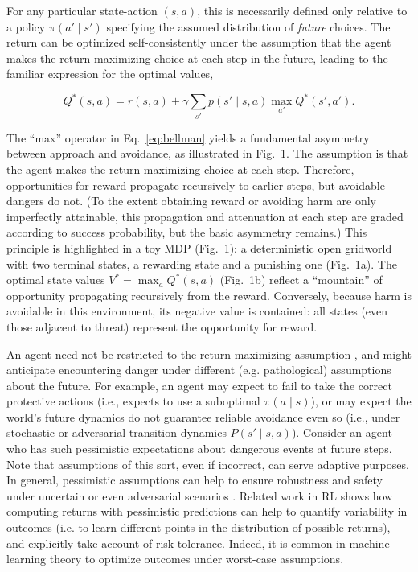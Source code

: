 \documentclass[11pt]{article} %
\begin{document}
For any particular state-action $(s,a)$, this is necessarily defined only relative to a policy $\pi(a' \mid s')$ specifying the assumed distribution of \emph{future} choices. The return can be optimized self-consistently under the assumption that the agent makes the return-maximizing choice at each step in the future, leading to the familiar expression for the optimal values,

\begin{equation}\label{eq:bellman}
 Q^*(s,a) = r(s,a) + \gamma \sum_{s'} p(s' \mid s,a) \max_{a'} Q^*(s',a').
\end{equation}

The ``max'' operator in Eq.~\ref{eq:bellman} yields a fundamental asymmetry between approach and avoidance, as illustrated in Fig.~1. The assumption is that the agent makes the return-maximizing choice at each step. Therefore, opportunities for reward propagate recursively to earlier steps, but avoidable dangers do not. (To the extent obtaining reward or avoiding harm are only imperfectly attainable, this propagation and attenuation at each step are graded according to success probability, but the basic asymmetry remains.) This principle is highlighted in a toy MDP (Fig.~1): a deterministic open gridworld with two terminal states, a rewarding state and a punishing one (Fig.~1a). The optimal state values $V^* = \max_a Q^*(s,a)$ (Fig.~1b) reflect a ``mountain'' of opportunity propagating recursively from the reward. Conversely, because harm is avoidable in this environment, its negative value is contained: all states (even those adjacent to threat) represent the opportunity for reward.

An agent need not be restricted to the return-maximizing assumption \citep{symmonds2010}, and might anticipate encountering danger under different (e.g. pathological) assumptions about the future. For example, an agent may expect to fail to take the correct protective actions (i.e., expects to use a suboptimal $\pi(a \mid s)$), or may expect the world's future dynamics do not guarantee reliable avoidance even so (i.e., under stochastic or adversarial transition dynamics $P(s' \mid s,a)$). Consider an agent who has such pessimistic expectations about dangerous events at future steps. Note that assumptions of this sort, even if incorrect, can serve adaptive purposes. In general, pessimistic assumptions can help to ensure robustness and safety under uncertain or even adversarial scenarios \cite{Garcia2015}. Related work in RL shows how computing returns with pessimistic predictions can help to quantify variability in outcomes (i.e. to learn different points in the distribution of possible returns)\cite{bellemare2017}, and explicitly take account of risk tolerance. Indeed, it is common in machine learning theory to optimize outcomes under worst-case assumptions. 
\end{document}
